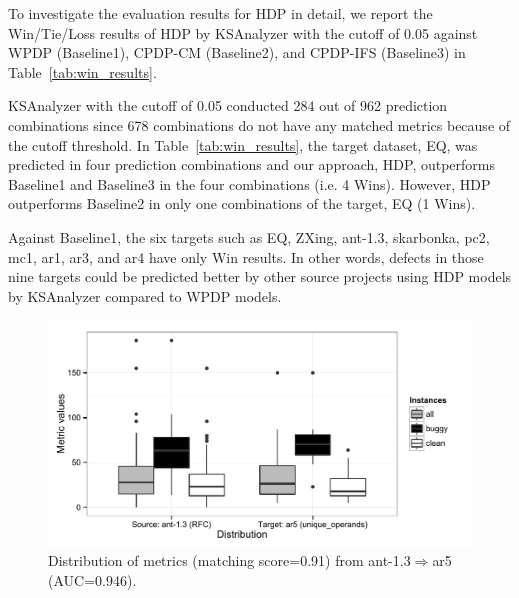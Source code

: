 To investigate the evaluation results for HDP in detail, we report
the Win/Tie/Loss results of HDP by KSAnalyzer with the cutoff of 0.05 against
WPDP (Baseline1), CPDP-CM (Baseline2), and CPDP-IFS
(Baseline3) in Table~\ref{tab:win_results}.


KSAnalyzer with the cutoff of 0.05 conducted 284 out of 962 prediction
combinations since 678 combinations do not have any matched
metrics because of the cutoff threshold. In
Table~\ref{tab:win_results}, the target dataset, EQ, was predicted in four
prediction combinations and our approach, HDP, outperforms Baseline1 and
Baseline3 in the four combinations (i.e. 4 Wins). However, HDP outperforms
Baseline2 in only one combinations of the target, EQ (1 Wins).



Against Baseline1, the six targets such as EQ, ZXing, ant-1.3, skarbonka, pc2,
mc1, ar1, ar3, and ar4 have only Win results. In other words, defects in those nine targets
could be predicted better by other source projects using HDP models by
KSAnalyzer compared to WPDP models.

\label{sec:why}
\begin{figure}[t]
	\centering
	\includegraphics[width=\linewidth]{Figures/Result/best_dist_bplot.pdf}
	\caption{Distribution of metrics (matching score=0.91)
	from ant-1.3$\Rightarrow$ar5 (AUC=0.946).}
	\label{fig:best_dist}
\end{figure}


